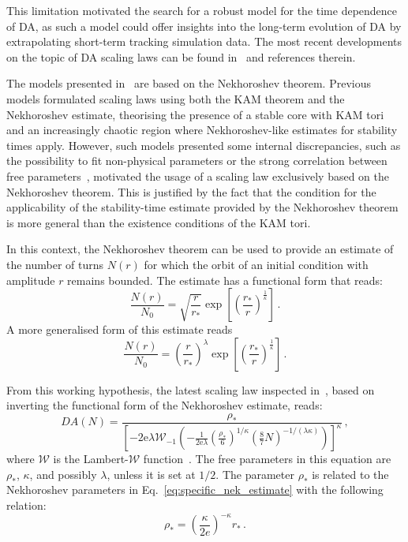 This limitation motivated the search for a robust model for the time dependence of DA, as such a model could offer insights into the long-term evolution of DA by extrapolating short-term tracking simulation data. The most recent developments on the topic of DA scaling laws can be found in~\cite{Bazzani:2019csk} and references therein.

The models presented in~\cite{Bazzani:2019csk} are based on the Nekhoroshev theorem. Previous models formulated scaling laws using both the KAM theorem and the Nekhoroshev estimate, theorising the presence of a stable core with KAM tori and an increasingly chaotic region where Nekhoroshev-like estimates for stability times apply. However, such models presented some internal discrepancies, such as the possibility to fit non-physical parameters or the strong correlation between free parameters~\cite{Giovannozzi:2018wmm,Giovannozzi:2018igq}, motivated the usage of a scaling law exclusively based on the Nekhoroshev theorem. This is justified by the fact that the condition for the applicability of the stability-time estimate provided by the Nekhoroshev theorem is more general than the existence conditions of the KAM tori.

In this context, the Nekhoroshev theorem can be used to provide an estimate of the number of turns $N(r)$ for which the orbit of an initial condition with amplitude $r$ remains bounded. The estimate has a functional form that reads:
\begin{equation}
    \frac{N(r)}{N_0} = \sqrt{\frac{r}{r_\ast}} \exp\left[\left(\frac{r_\ast}{r}\right)^{\frac{1}{\kappa}}\right]\,.
    \label{eq:specific_nek_estimate}
\end{equation}
A more generalised form of this estimate reads
\begin{equation}
    \frac{N(r)}{N_0} = \left(\frac{r}{r_\ast}\right)^{\lambda} \exp\left[\left(\frac{r_\ast}{r}\right)^{\frac{1}{\kappa}}\right]\,.
\end{equation}

From this working hypothesis, the latest scaling law inspected in~\cite{Bazzani:2019csk}, based on inverting the functional form of the Nekhoroshev estimate, reads:
\begin{equation}
	DA(N) = \frac{\rho_\ast}{\left[-2 \mathrm{e} \lambda \mathcal{W}_{-1}\left(-\frac{1}{2 \mathrm{e} \lambda}\left(\frac{\rho_*}{6}\right)^{1 / \kappa}\left(\frac{8}{7} N\right)^{-1 /(\lambda \kappa)}\right)\right]^\kappa}\,,
	\label{eq:giova_interpolation}
\end{equation}
where $\mathcal{W}$ is the Lambert-$\mathcal{W}$ function~\cite{Corless1996}. The free parameters in this equation are $\rho_\ast$, $\kappa$, and possibly $\lambda$, unless it is set at $1/2$. The parameter $\rho_\ast$ is related to the Nekhoroshev parameters in Eq.~\eqref{eq:specific_nek_estimate} with the following relation:
\begin{equation}
    \rho_\ast = \left(\frac{\kappa}{2e}\right)^{-\kappa} r_\ast \,.
\end{equation}

